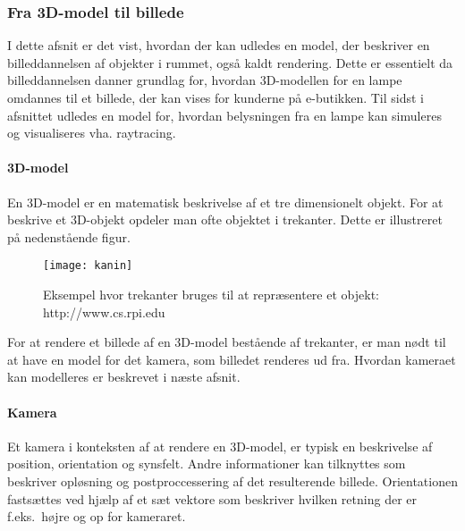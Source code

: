 \subsubsection{Fra 3D-model til billede}
\label{sec:fra_model_til_billede}
I dette afsnit er det vist, hvordan der kan udledes en model, der beskriver en billeddannelsen af objekter i rummet, også kaldt rendering. Dette er essentielt da billeddannelsen danner grundlag for, hvordan 3D-modellen for en lampe omdannes til et billede, der kan vises for kunderne på e-butikken. Til sidst i afsnittet udledes en model for, hvordan belysningen fra en lampe kan simuleres og visualiseres vha. raytracing. 

\paragraph{3D-model}
En 3D-model er en matematisk beskrivelse af et tre dimensionelt objekt. For at beskrive et 3D-objekt opdeler man ofte objektet i trekanter. Dette er illustreret på nedenstående figur.

\begin{figure}[H]
\label{fig:kanin}
    \centering
    \texttt{[image: kanin]}
    \caption{Eksempel hvor trekanter bruges til at repræsentere et objekt: http://www.cs.rpi.edu}
\end{figure}

For at rendere et billede af en 3D-model bestående af trekanter, er man nødt til at have en model for det kamera, som billedet renderes ud fra. Hvordan kameraet kan modelleres er beskrevet i næste afsnit.

\paragraph{Kamera}
Et kamera i konteksten af at rendere en 3D-model, er typisk en beskrivelse af position, orientation og synsfelt. Andre informationer kan tilknyttes som beskriver opløsning og postproccessering af det resulterende billede. Orientationen fastsættes ved hjælp af et sæt vektore som beskriver hvilken retning der er f.eks.\ højre og op for kameraret.

